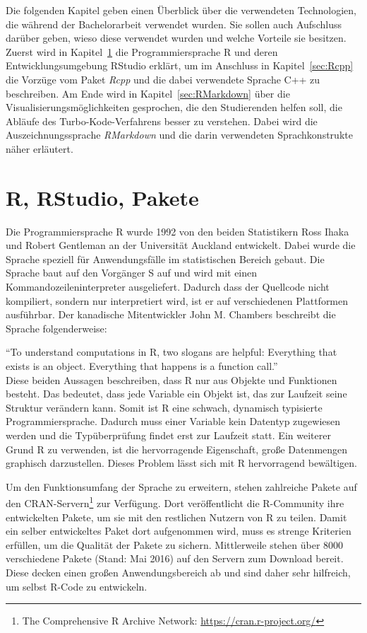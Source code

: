 Die folgenden Kapitel geben einen Überblick über die verwendeten Technologien, die während der Bachelorarbeit verwendet wurden. Sie sollen auch Aufschluss darüber geben, wieso diese verwendet wurden und welche Vorteile sie besitzen. Zuerst wird in Kapitel~\ref{sec:R} die Programmiersprache R und deren Entwicklungsumgebung RStudio erklärt, um im Anschluss in Kapitel~\ref{sec:Rcpp} die Vorzüge vom Paket \emph{Rcpp} und die dabei verwendete Sprache C++ zu beschreiben. Am Ende wird in Kapitel~\ref{sec:RMarkdown} über die Visualisierungsmöglichkeiten gesprochen, die den Studierenden helfen soll, die Abläufe des Turbo-Kode-Verfahrens besser zu verstehen. Dabei wird die Auszeichnungssprache \emph{RMarkdown} und die darin verwendeten Sprachkonstrukte näher erläutert.

\section{R, RStudio, Pakete}
\label{sec:R}
Die Programmiersprache R wurde 1992 von den beiden Statistikern  Ross Ihaka und Robert Gentleman an der Universität Auckland entwickelt. Dabei wurde die Sprache speziell für Anwendungsfälle im statistischen Bereich gebaut. Die Sprache baut auf den Vorgänger S auf und wird mit einen Kommandozeileninterpreter ausgeliefert. Dadurch dass der Quellcode nicht kompiliert, sondern nur interpretiert wird, ist er auf verschiedenen Plattformen ausführbar. Der kanadische Mitentwickler John M. Chambers beschreibt die Sprache folgenderweise:

\enquote{To understand computations in R, two slogans are helpful: Everything that exists is an object. Everything that happens is a function call.} \cite{chambers2014object}\\

Diese beiden Aussagen beschreiben, dass R nur aus Objekte und Funktionen besteht. Das bedeutet, dass jede Variable ein Objekt ist, das zur Laufzeit seine Struktur verändern kann. Somit ist R eine schwach, dynamisch typisierte Programmiersprache. Dadurch muss einer Variable kein Datentyp zugewiesen werden und die Typüberprüfung findet erst zur Laufzeit statt. Ein weiterer Grund R zu verwenden, ist die hervorragende Eigenschaft, große Datenmengen graphisch darzustellen. Dieses Problem lässt sich mit R hervorragend bewältigen.

Um den Funktionsumfang der Sprache zu erweitern, stehen zahlreiche Pakete auf den CRAN-Servern\footnote{The Comprehensive R Archive Network: \url{https://cran.r-project.org/}} zur Verfügung. Dort veröffentlicht die R-Community ihre entwickelten Pakete, um sie mit den restlichen Nutzern von R zu teilen. Damit ein selber entwickeltes Paket dort aufgenommen wird, muss es strenge Kriterien erfüllen, um die Qualität der Pakete zu sichern. Mittlerweile stehen über 8000 verschiedene Pakete (Stand: Mai 2016) auf den Servern zum Download bereit. Diese decken einen großen Anwendungsbereich ab und sind daher sehr hilfreich, um selbst R-Code zu entwickeln. \cite{rmanual}

